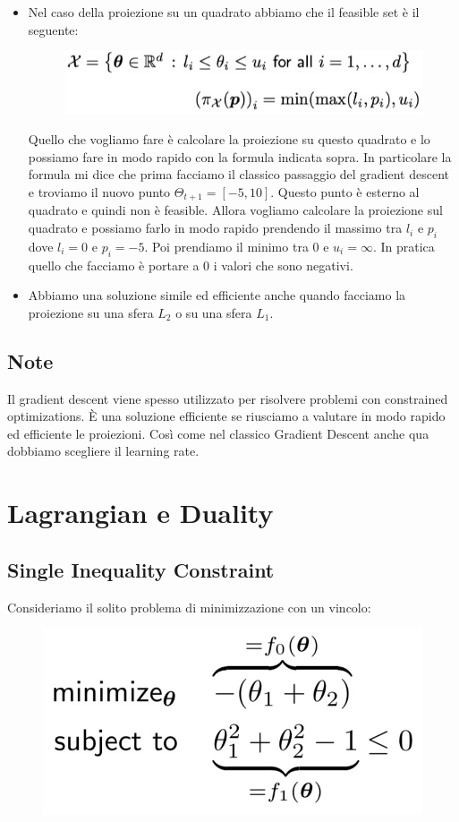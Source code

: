 \documentclass[14pt]{extreport}
\begin{document}
\begin{itemize}
\item Nel caso della proiezione su un quadrato abbiamo che il feasible set è il seguente:\begin{figure}[H]
\centering 
\includegraphics[width=0.7\linewidth]{287.jpeg}
\end{figure}
Quello che vogliamo fare è calcolare la proiezione su questo quadrato e lo possiamo fare in modo rapido con la formula indicata sopra. In particolare
la formula mi dice che prima facciamo il classico passaggio del gradient descent e troviamo il nuovo punto $\Theta_{t+1} = [-5, 10]$. Questo punto è
esterno al quadrato e quindi non è feasible. Allora vogliamo calcolare la proiezione sul quadrato e possiamo farlo in modo rapido prendendo il massimo
tra $l_i$ e $p_i$ dove $l_i = 0$ e $p_i = -5$. Poi prendiamo il minimo tra 0 e $u_i = \infty$. In pratica quello che facciamo è portare a 0 i valori
che sono negativi.
\item Abbiamo una soluzione simile ed efficiente anche quando facciamo la proiezione su una sfera $L_2$ o su una sfera $L_1$.
\end{itemize}

\subsection{Note}

Il gradient descent viene spesso utilizzato per risolvere problemi con constrained optimizations. È una soluzione efficiente se riusciamo a valutare
in modo rapido ed efficiente le proiezioni. Così come nel classico Gradient Descent anche qua dobbiamo scegliere il learning rate.

\section{Lagrangian e Duality}

\subsection{Single Inequality Constraint}

Consideriamo il solito problema di minimizzazione con un vincolo:

\begin{figure}[H]
\centering
\includegraphics[width=0.4\linewidth]{289.jpeg}
\end{figure}
\end{document}
